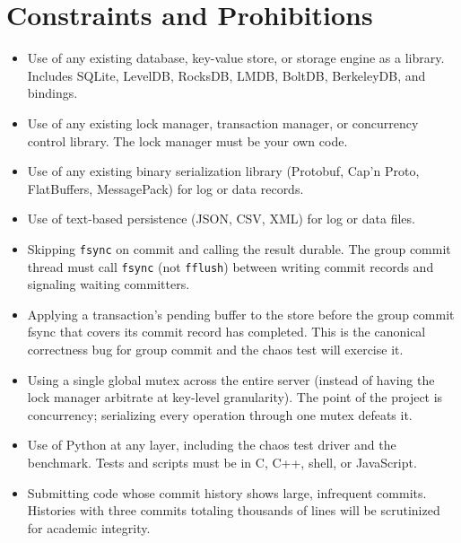 \documentclass[11pt,a4paper]{article}
\begin{document}
\section{Constraints and Prohibitions}

\begin{notebox}
\begin{itemize}
\item Use of any existing database, key-value store, or storage engine as a library. Includes SQLite, LevelDB, RocksDB, LMDB, BoltDB, BerkeleyDB, and bindings.

\item Use of any existing lock manager, transaction manager, or concurrency control library. The lock manager must be your own code.

\item Use of any existing binary serialization library (Protobuf, Cap'n Proto, FlatBuffers, MessagePack) for log or data records.

\item Use of text-based persistence (JSON, CSV, XML) for log or data files.

\item Skipping \texttt{fsync} on commit and calling the result durable. The group commit thread must call \texttt{fsync} (not \texttt{fflush}) between writing commit records and signaling waiting committers.

\item Applying a transaction's pending buffer to the store before the group commit fsync that covers its commit record has completed. This is the canonical correctness bug for group commit and the chaos test will exercise it.

\item Using a single global mutex across the entire server (instead of having the lock manager arbitrate at key-level granularity). The point of the project is concurrency; serializing every operation through one mutex defeats it.

\item Use of Python at any layer, including the chaos test driver and the benchmark. Tests and scripts must be in C, C++, shell, or JavaScript.

\item Submitting code whose commit history shows large, infrequent commits. Histories with three commits totaling thousands of lines will be scrutinized for academic integrity.
\end{itemize}
\end{notebox}
\end{document}
